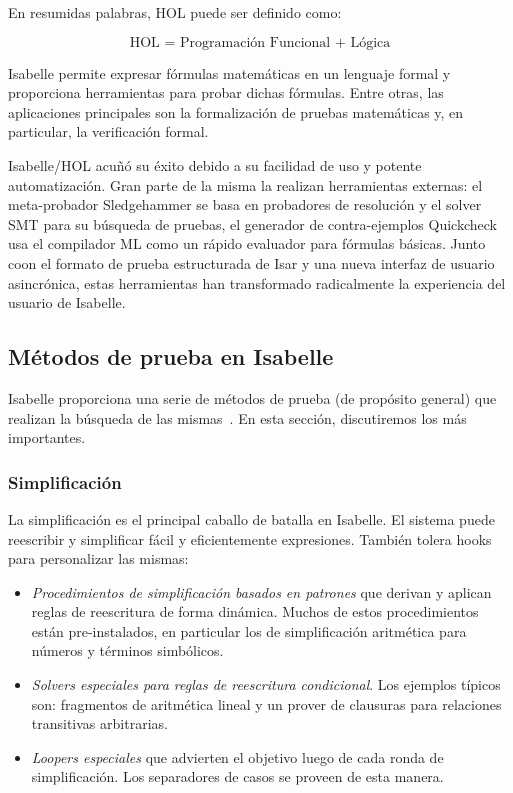 \documentclass[12pt]{book}
\begin{document}
En resumidas palabras, HOL puede ser definido como:

\[ \boxed{\text{HOL = Programación Funcional + Lógica}} \]

Isabelle permite expresar fórmulas matemáticas en un lenguaje formal y proporciona herramientas para probar dichas fórmulas. Entre otras, las aplicaciones principales son la formalización de pruebas matemáticas y, en particular, la verificación formal.

Isabelle/HOL acuñó su éxito debido a su facilidad de uso y potente automatización. Gran parte de la misma la realizan herramientas externas: el meta-probador Sledgehammer se basa en probadores de resolución y el solver SMT para su búsqueda de pruebas, el generador de contra-ejemplos Quickcheck usa el compilador ML como un rápido evaluador para fórmulas básicas. Junto coon el formato de prueba estructurada de Isar y una nueva interfaz de usuario asincrónica, estas herramientas han transformado radicalmente la experiencia del usuario de Isabelle.

\subsection{Métodos de prueba en Isabelle}

Isabelle proporciona una serie de métodos de prueba (de propósito general) que realizan la búsqueda de las mismas~\cite{proof_and_disproof}. En esta sección, discutiremos los más importantes.

\subsubsection{Simplificación}

La simplificación es el principal caballo de batalla en Isabelle. El sistema puede reescribir y simplificar fácil y eficientemente expresiones. También tolera hooks para personalizar las mismas:

\begin{itemize}
	\item \textit{Procedimientos de simplificación basados en patrones} que derivan y aplican reglas de reescritura de forma dinámica. Muchos de estos procedimientos están pre-instalados, en particular los de simplificación aritmética para números y términos simbólicos.
	\item \textit{Solvers especiales para reglas de reescritura condicional}. Los ejemplos típicos son: fragmentos de aritmética lineal y un prover de clausuras para relaciones transitivas arbitrarias.
	\item \textit{\textit{Loopers} especiales} que advierten el objetivo luego de cada ronda de simplificación. Los separadores de casos se proveen de esta manera.
\end{itemize}
\end{document}
